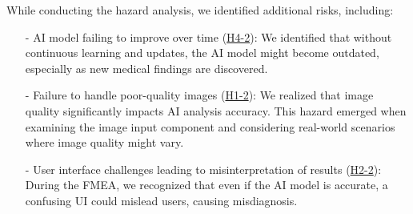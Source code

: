 \documentclass{article}
\begin{document}
\begin{enumerate}
    While conducting the hazard analysis, we identified additional risks, including:

    \begin{itemize}
        \item[-] AI model failing to improve over time (\hyperlink{H4-2}{H4-2}): We identified that without continuous learning and updates, the AI model might become outdated, especially as new medical findings are discovered.
        \item[-]Failure to handle poor-quality images (\hyperlink{H1-2}{H1-2}): We realized that image quality significantly impacts AI analysis accuracy. This hazard emerged when examining the image input component and considering real-world scenarios where image quality might vary.
        \item[-]User interface challenges leading to misinterpretation of results (\hyperlink{H2-2}{H2-2}): During the FMEA, we recognized that even if the AI model is accurate, a confusing UI could mislead users, causing misdiagnosis.
    \end{itemize}


\end{enumerate}
\end{document}
